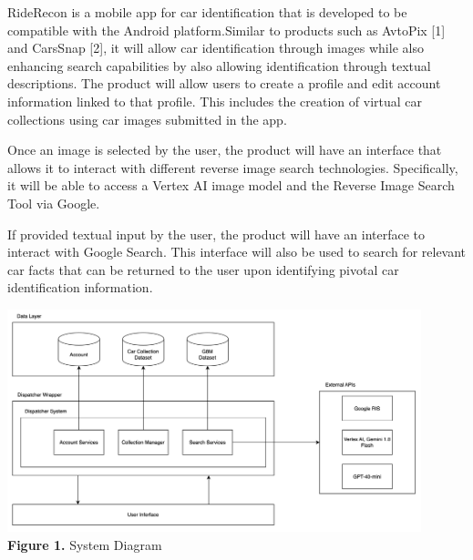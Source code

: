 \documentclass[]{article}
\begin{document}
RideRecon is a mobile app for car identification that is developed to be compatible with the Android platform.Similar to products such as AvtoPix [1] and CarsSnap [2], it will allow car identification through images while also enhancing search capabilities by also allowing identification through textual descriptions. The product will allow users to create a profile and edit account information linked to that profile. This includes the creation of virtual car collections using car images submitted in the app.

Once an image is selected by the user, the product will have an interface that allows it to interact with different reverse image search technologies. Specifically, it will be able to access a Vertex AI image model and the Reverse Image Search Tool via Google.

If provided textual input by the user, the product will have an interface to interact with Google Search. This interface will also be used to search for relevant car facts that can be returned to the user upon identifying pivotal car identification information.

\begin{center}
	\includegraphics[width=0.9\textwidth]{images/system_diagram.png} \\
	\textbf{Figure 1. } System Diagram
\end{center}


\newpage
\end{document}
